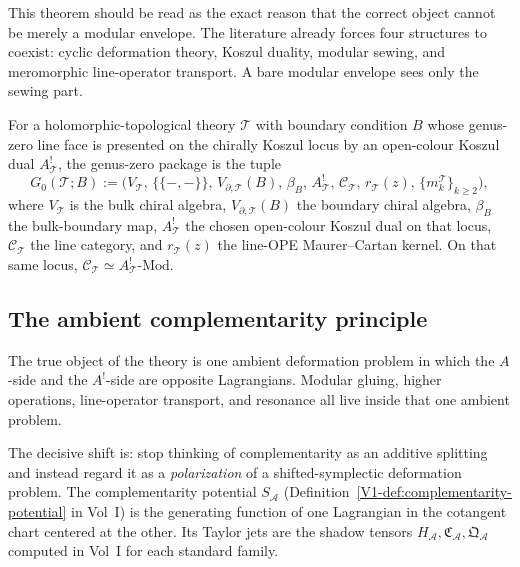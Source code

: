 \begin{remark}
This theorem should be read as the exact reason that the correct
object cannot be merely a modular envelope. The literature already
forces four structures to coexist: cyclic deformation theory, Koszul
duality, modular sewing, and meromorphic line-operator transport.
A bare modular envelope sees only the sewing part.
\end{remark}

\begin{definition}
For a holomorphic-topological theory $\mathcal{T}$ with boundary
condition $B$ whose genus-zero line face is presented on the
chirally Koszul locus by an open-colour Koszul dual
$A^!_{\mathcal{T}}$, the genus-zero package is the tuple
\begin{equation}
G_0(\mathcal{T}; B)
:=
\bigl(
V_{\mathcal{T}},\,
\{\!\{-,-\}\!\},\,
V_{\partial,\mathcal{T}}(B),\,
\beta_B,\,
A^!_{\mathcal{T}},\,
\mathcal{C}_{\mathcal{T}},\,
r_{\mathcal{T}}(z),\,
\{m_k^{\mathcal{T}}\}_{k \geq 2}
\bigr),
\end{equation}
where $V_{\mathcal{T}}$ is the bulk chiral algebra,
$V_{\partial,\mathcal{T}}(B)$ the boundary chiral algebra,
$\beta_B$ the bulk-boundary map, $A^!_{\mathcal{T}}$ the chosen
open-colour Koszul dual on that locus,
$\mathcal{C}_{\mathcal{T}}$ the line category, and
$r_{\mathcal{T}}(z)$ the line-OPE Maurer--Cartan kernel. On that
same locus,
$\mathcal{C}_{\mathcal{T}} \simeq A^!_{\mathcal{T}}\text{-Mod}$.
\end{definition}

\subsection{The ambient complementarity principle}

\begin{principle}
The true object of the theory is one ambient deformation problem in
which the $A$-side and the $A^!$-side are opposite Lagrangians.
Modular gluing, higher operations, line-operator transport, and
resonance all live inside that one ambient problem.
\end{principle}

The decisive shift is: stop thinking of complementarity as an
additive splitting and instead regard it as a \emph{polarization}
of a shifted-symplectic deformation problem. The complementarity
potential $S_{\mathcal{A}}$
(Definition~\ref*{V1-def:complementarity-potential} in Vol~I) is the
generating function of one Lagrangian in the cotangent chart
centered at the other. Its Taylor jets are the shadow tensors
$H_{\mathcal{A}}, \mathfrak{C}_{\mathcal{A}},
\mathfrak{Q}_{\mathcal{A}}$ computed in
Vol~I for each standard family.

